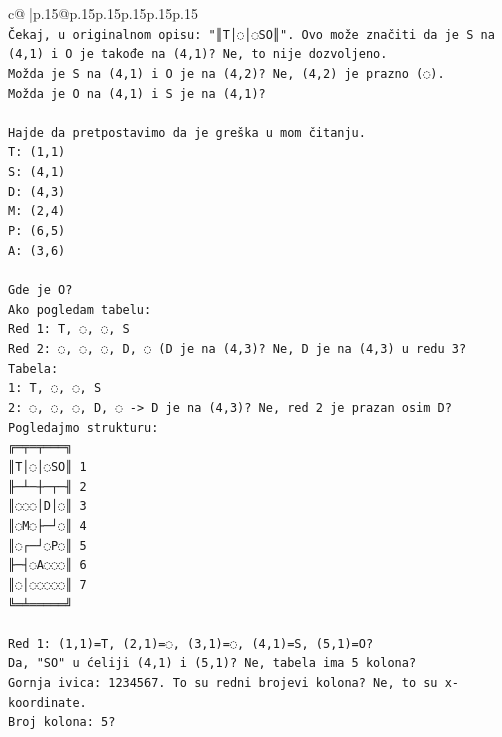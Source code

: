 \documentclass{article}
\begin{document}
{\begin{supertabular}{c@{$\;$}|p{.15\linewidth}@{}p{.15\linewidth}p{.15\linewidth}p{.15\linewidth}p{.15\linewidth}p{.15\linewidth}}
{{{\\ 
\texttt{Čekaj, u originalnom opisu: "║T│◌│◌SO║". Ovo može značiti da je S na (4,1) i O je takođe na (4,1)? Ne, to nije dozvoljeno.} \\
\texttt{Možda je S na (4,1) i O je na (4,2)? Ne, (4,2) je prazno (◌).} \\
\texttt{Možda je O na (4,1) i S je na (4,1)?} \\
\\ 
\texttt{Hajde da pretpostavimo da je greška u mom čitanju.} \\
\texttt{T: (1,1)} \\
\texttt{S: (4,1)} \\
\texttt{D: (4,3)} \\
\texttt{M: (2,4)} \\
\texttt{P: (6,5)} \\
\texttt{A: (3,6)} \\
\\ 
\texttt{Gde je O?} \\
\texttt{Ako pogledam tabelu:} \\
\texttt{Red 1: T, ◌, ◌, S} \\
\texttt{Red 2: ◌, ◌, ◌, D, ◌ (D je na (4,3)? Ne, D je na (4,3) u redu 3?} \\
\texttt{Tabela:} \\
\texttt{1: T, ◌, ◌, S} \\
\texttt{2: ◌, ◌, ◌, D, ◌ {-}> D je na (4,3)? Ne, red 2 je prazan osim D?} \\
\texttt{Pogledajmo strukturu:} \\
\texttt{╔═╤═╤═══╗} \\
\texttt{║T│◌│◌SO║ 1} \\
\texttt{╟─┴─┼─┬─╢ 2} \\
\texttt{║◌◌◌│D│◌║ 3} \\
\texttt{║◌M◌├─┘◌║ 4} \\
\texttt{║◌┌─┘◌P◌║ 5} \\
\texttt{╟─┤◌A◌◌◌║ 6} \\
\texttt{║◌│◌◌◌◌◌║ 7} \\
\texttt{╚═╧═════╝} \\
\\ 
\texttt{Red 1: (1,1)=T, (2,1)=◌, (3,1)=◌, (4,1)=S, (5,1)=O?} \\
\texttt{Da, "SO" u ćeliji (4,1) i (5,1)? Ne, tabela ima 5 kolona?} \\
\texttt{Gornja ivica: 1234567. To su redni brojevi kolona? Ne, to su x{-}koordinate.} \\
\texttt{Broj kolona: 5?} \\
}}}
\end{supertabular}}
\end{document}
